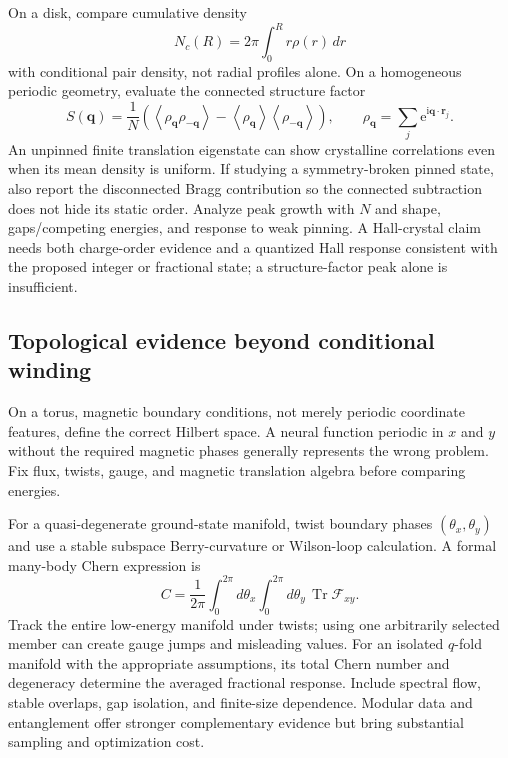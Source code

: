 \documentclass[11pt,letterpaper]{article}
\newcommand{\rr}{\mathbf r}
\newcommand{\ee}{\mathrm e}
\newcommand{\ii}{\mathrm i}
\newcommand{\avg}[1]{\left\langle #1\right\rangle}
\begin{document}
On a disk, compare cumulative density
\begin{equation}
 N_c(R)=2\pi\int_0^Rr\rho(r)\,dr
\end{equation}
with conditional pair density, not radial profiles alone. On a homogeneous periodic geometry, evaluate the connected structure factor
\begin{equation}
 S(\mathbf q)=\frac1N\left(\avg{\rho_{\mathbf q}\rho_{-\mathbf q}}
 -\avg{\rho_{\mathbf q}}\avg{\rho_{-\mathbf q}}\right),\qquad
 \rho_{\mathbf q}=\sum_j\ee^{\ii\mathbf q\cdot\rr_j}.
\end{equation}
An unpinned finite translation eigenstate can show crystalline correlations even when its mean density is uniform. If studying a symmetry-broken pinned state, also report the disconnected Bragg contribution so the connected subtraction does not hide its static order. Analyze peak growth with $N$ and shape, gaps/competing energies, and response to weak pinning. A Hall-crystal claim needs both charge-order evidence and a quantized Hall response consistent with the proposed integer or fractional state; a structure-factor peak alone is insufficient.

\subsection{Topological evidence beyond conditional winding}

On a torus, magnetic boundary conditions, not merely periodic coordinate features, define the correct Hilbert space. A neural function periodic in $x$ and $y$ without the required magnetic phases generally represents the wrong problem. Fix flux, twists, gauge, and magnetic translation algebra before comparing energies.

For a quasi-degenerate ground-state manifold, twist boundary phases $(\theta_x,\theta_y)$ and use a stable subspace Berry-curvature or Wilson-loop calculation. A formal many-body Chern expression is
\begin{equation}
 C=\frac1{2\pi}\int_0^{2\pi}\!d\theta_x\int_0^{2\pi}\!d\theta_y\,
 \operatorname{Tr}\mathcal F_{xy}.
\end{equation}
Track the entire low-energy manifold under twists; using one arbitrarily selected member can create gauge jumps and misleading values. For an isolated $q$-fold manifold with the appropriate assumptions, its total Chern number and degeneracy determine the averaged fractional response. Include spectral flow, stable overlaps, gap isolation, and finite-size dependence. Modular data and entanglement offer stronger complementary evidence but bring substantial sampling and optimization cost.
\end{document}
